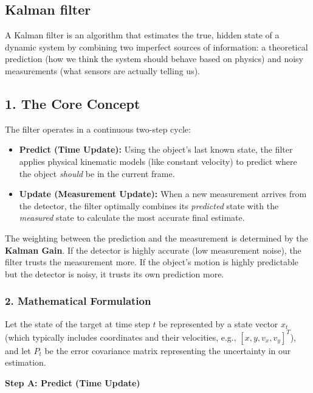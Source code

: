 \documentclass[10pt,twocolumn,letterpaper]{article}
\begin{document}
\subsection{Kalman filter}
A Kalman filter is an algorithm that estimates the true, hidden state of a dynamic system by combining two imperfect sources of information: a theoretical prediction (how we think the system should behave based on physics) and noisy measurements (what sensors are actually telling us).

\subsection*{1. The Core Concept}
The filter operates in a continuous two-step cycle:
\begin{itemize}
    \item \textbf{Predict (Time Update):} Using the object's last known state, the filter applies physical kinematic models (like constant velocity) to predict where the object \textit{should} be in the current frame.
    \item \textbf{Update (Measurement Update):} When a new measurement arrives from the detector, the filter optimally combines its \textit{predicted} state with the \textit{measured} state to calculate the most accurate final estimate. 
\end{itemize}

The weighting between the prediction and the measurement is determined by the \textbf{Kalman Gain}. If the detector is highly accurate (low measurement noise), the filter trusts the measurement more. If the object's motion is highly predictable but the detector is noisy, it trusts its own prediction more.

\subsubsection*{2. Mathematical Formulation}
Let the state of the target at time step $t$ be represented by a state vector $x_t$ (which typically includes coordinates and their velocities, e.g., $[x, y, v_x, v_y]^T$), and let $P_t$ be the error covariance matrix representing the uncertainty in our estimation.

\noindent\textbf{Step A: Predict (Time Update)}
\end{document}
